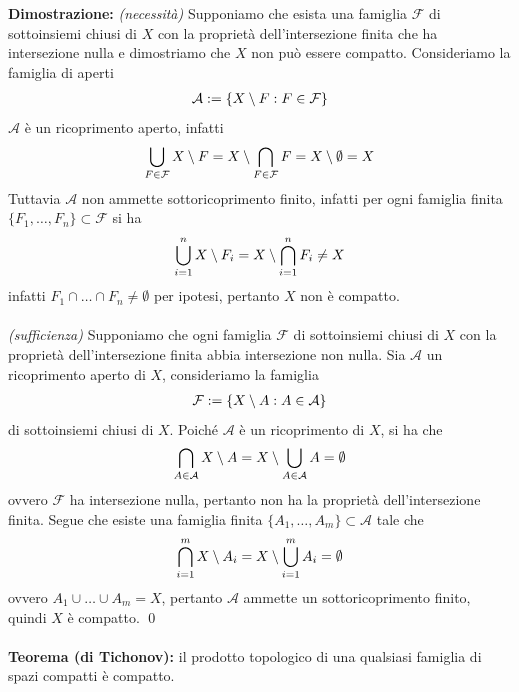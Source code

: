 \documentclass{article}
\begin{document}
\textbf{Dimostrazione:} \textit{(necessità)} Supponiamo che esista una famiglia $\mathcal{F}$ di sottoinsiemi chiusi di $X$ con la proprietà dell'intersezione finita che ha intersezione nulla e dimostriamo che $X$ non può essere compatto. Consideriamo la famiglia di aperti
\begin{gather}
    \mathcal{A} := \{ X \setminus F : F \in \mathcal{F} \} \notag
\end{gather}
$\mathcal{A}$ è un ricoprimento aperto, infatti
\begin{gather}
    \bigcup_{F \in \mathcal{F}} X \setminus F = X \setminus \bigcap_{F \in \mathcal{F}} F = X \setminus \emptyset = X \notag
\end{gather}
Tuttavia $\mathcal{A}$ non ammette sottoricoprimento finito, infatti per ogni famiglia finita $\{ F_1, \dots, F_n \} \subset \mathcal{F}$ si ha
\begin{gather}
    \bigcup_{i = 1}^n X \setminus F_i = X \setminus \bigcap_{i = 1}^n F_i \neq X \notag 
\end{gather}
infatti $F_1 \cap \dots \cap F_n \neq \emptyset$ per ipotesi, pertanto $X$ non è compatto. \\ \\
\textit{(sufficienza)} Supponiamo che ogni famiglia $\mathcal{F}$ di sottoinsiemi chiusi di $X$ con la proprietà dell'intersezione finita abbia intersezione non nulla. Sia $\mathcal{A}$ un ricoprimento aperto di $X$, consideriamo la famiglia
\begin{gather}
    \mathcal{F} := \{ X \setminus A : A \in \mathcal{A} \} \notag
\end{gather}
di sottoinsiemi chiusi di $X$. Poiché $\mathcal{A}$ è un ricoprimento di $X$, si ha che
\begin{gather}
    \bigcap_{A \in \mathcal{A}} X \setminus A = X \setminus \bigcup_{A \in \mathcal{A}} A = \emptyset \notag
\end{gather}
ovvero $\mathcal{F}$ ha intersezione nulla, pertanto non ha la proprietà dell'intersezione finita. Segue che esiste una famiglia finita $\{ A_1, \dots, A_m \} \subset \mathcal{A}$ tale che
\begin{gather}
    \bigcap_{i = 1}^m X \setminus A_i = X \setminus \bigcup_{i = 1}^m A_i = \emptyset \notag
\end{gather}
ovvero $A_1 \cup \dots \cup A_m = X$, pertanto $\mathcal{A}$ ammette un sottoricoprimento finito, quindi $X$ è compatto. \qed \\ \\
\textbf{Teorema (di Tichonov):} il prodotto topologico di una qualsiasi famiglia di spazi compatti è compatto. \\
\end{document}
